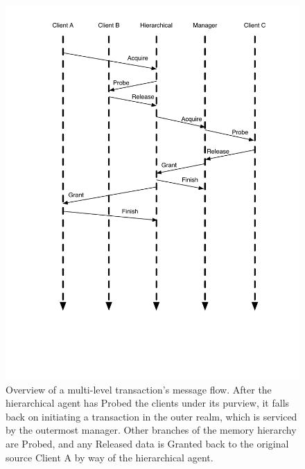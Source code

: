 \begin{figure}[p]
\centering
\includegraphics[width=0.8\columnwidth]{tilelink/figures/standard5.pdf}
\caption[Overview of a multi-level transaction's message flow.]{
Overview of a multi-level transaction's message flow.
After the hierarchical agent has Probed the clients under its purview, it falls back on initiating a transaction in the outer realm,
which is serviced by the outermost manager. Other branches of the memory hierarchy are Probed,
and any Released data is Granted back to the original source Client A by way of the hierarchical agent.
}
\label{fig:standard5}
\end{figure}

